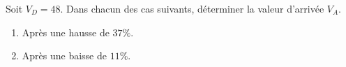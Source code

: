 \begin{exo}{}
	Soit $V_D = 48$. Dans chacun des cas suivants, déterminer la valeur d'arrivée $V_A$.
	\begin{enumerate}
		\item Après une hausse de $37\%$.
		\item Après une baisse de $11\%$.
	\end{enumerate}
\end{exo}
